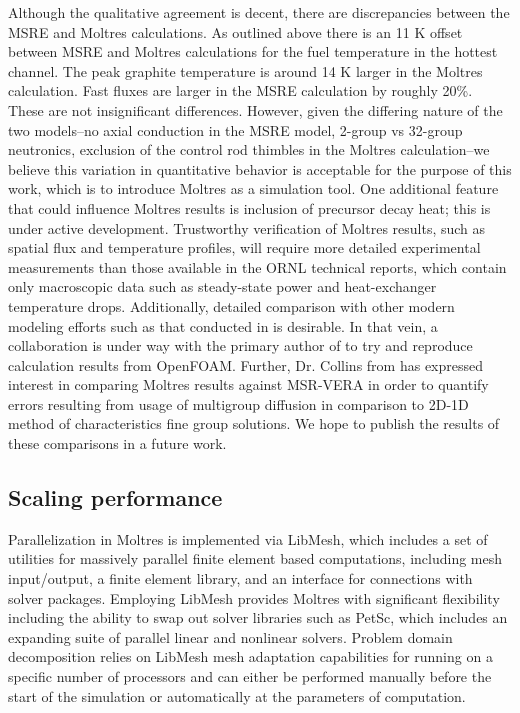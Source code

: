 \documentclass{article}
\let\Oldsubsection\subsection
\renewcommand{\subsection}{\FloatBarrier\Oldsubsection}
\begin{document}
Although the qualitative agreement is decent, there are discrepancies between
the \gls{MSRE} and Moltres calculations. As outlined above there is an 11 K
offset between \gls{MSRE} and Moltres calculations for the fuel temperature in
the hottest channel. The peak graphite temperature is around 14 K larger in the
Moltres calculation. Fast fluxes are larger in the \gls{MSRE} calculation by
roughly 20\%. These are not insignificant differences. However, given the
differing nature of the two models--no axial conduction in the \gls{MSRE} model,
2-group vs 32-group neutronics, exclusion of the control rod thimbles in the
Moltres calculation--we believe this variation in quantitative behavior is
acceptable for the purpose of this work, which is to introduce Moltres as a
simulation tool. One additional feature that could influence Moltres results is
inclusion of precursor decay heat; this is under active development. Trustworthy
verification of Moltres results, such as spatial flux and temperature profiles,
will require more detailed experimental measurements than those available in the
\gls{ORNL} technical reports, which contain only macroscopic data such as
steady-state power and heat-exchanger temperature drops. Additionally, detailed
comparison with other modern modeling efforts such as that conducted in
\cite{aufiero_development_2014,laureau_transient_2017} is desirable. In that
vein, a collaboration is under way with the primary author of
\cite{aufiero_develoment_2014} to try and reproduce calculation results from
OpenFOAM. Further, Dr. Collins from \cite{turner_virtual_2016} has expressed interest
in comparing Moltres results against MSR-VERA in order to quantify errors resulting
from usage of multigroup diffusion in comparison to 2D-1D method of characteristics fine group solutions.
We hope to publish the results of these comparisons in a future work.

\subsection{Scaling performance}

Parallelization in Moltres is implemented via LibMesh, which includes a set of
utilities for massively parallel finite element based computations, including
mesh input/output, a finite element library, and an interface for connections with
solver packages. Employing LibMesh provides Moltres with
significant flexibility including the ability to swap out solver libraries
such as PetSc, which includes an expanding suite of parallel linear and
nonlinear solvers. Problem domain decomposition relies on LibMesh mesh
adaptation capabilities for running on a specific number of processors and
can either be performed manually before the start of the simulation or
automatically at the parameters of computation.
\end{document}
